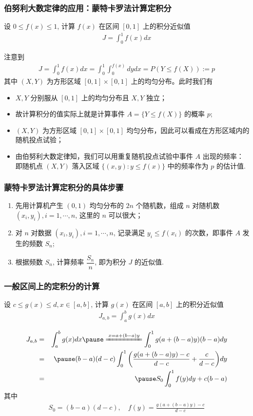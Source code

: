 \documentclass[Prob-All.tex]{subfiles}
\begin{document}
\begin{frame}
	\frametitle{伯努利大数定律的应用：蒙特卡罗法计算定积分}
	\begin{prob}
		设 $0\le f (x)\le 1$, 计算 $f (x)$ 在区间 $[0,1]$ 上的积分近似值
		\begin{eqnarray*}
			J=\int_0^1f(x)dx
		\end{eqnarray*}
	\end{prob}
	\pause \jieda 注意到
	\begin{eqnarray*}
		J=\int_0^1f(x)dx=\int_0^1\int_0^{f(x)}dydx=P(Y\le f(X)):=p
	\end{eqnarray*}
	其中 $(X,Y)$ 为方形区域 $[0,1]\times [0,1]$ 上的均匀分布。此时我们有 \pause
	\begin{itemize}[<+-|alert@+>]
		\item $X,Y$ 分别服从 $[0,1]$ 上的均匀分布且 $X,Y$ 独立；
		\item 故计算积分的值实际上就是计算事件 $A=\{Y\le f (X)\}$ 的概率 $p$;
		\item $(X,Y)$ 为方形区域 $[0,1]\times [0,1]$ 均匀分布，因此可以看成在方形区域内的随机投点试验；
		\item 由伯努利大数定律知，我们可以用重复随机投点试验中事件 $A$ 出现的频率：即随机点 $(X,Y)$ 落入区域 $\{(x,y):y\le f (x)\}$ 中的频率作为 $p$ 的估计值.

	\end{itemize}
\end{frame}
\begin{frame}
	\frametitle{蒙特卡罗法计算定积分的具体步骤}
	\begin{enumerate}[<+-|alert@+>]
		\item 先用计算机产生 $(0,1)$ 均匀分布的 $2n$ 个随机数，组成 $n$ 对随机数 $(x_i,y_i),i=1,\cdots,n$, 这里的 $n$ 可以很大；
		\item 对 $n$ 对数据 $(x_i,y_i), i=1,\cdots,n$, 记录满足 $y_i\le f (x_i)$ 的次数，即事件 $A$ 发生的频数 $S_n$;
		\item 根据频数 $S_n$, 计算频率 $\dfrac{S_n}{n}$, 即为积分 $J$ 的近似值.
	\end{enumerate}
\end{frame}
\begin{frame}
	\frametitle{一般区间上的定积分的计算}
	\begin{prob}
		设 $c\le g (x)\le d, x\in [a,b]$, 计算 $g (x)$ 在区间 $[a,b]$ 上的积分近似值
		\begin{eqnarray*}
			J_{a,b}=\int_a^bg(x)dx
		\end{eqnarray*}
	\end{prob}
	\pause \jieda
	\begin{eqnarray*}
		J_{a,b}&=&\int_a^bg(x)dx\pause \xlongequal{x=a+(b-a)y} \int_0^1g(a+(b-a)y)(b-a)dy\\
		&=&\pause (b-a)(d-c)\int_0^1\bigg(\frac{g(a+(b-a)y)-c}{d-c}+\frac{c}{d-c}\bigg)dy\\
		&=&\pause S_0\int_0^1f(y)dy+c(b-a)
	\end{eqnarray*}
	\pause 其中
	\begin{eqnarray*}
		S_0=(b-a)(d-c), \quad f(y)=\frac{g(a+(b-a)y)-c}{d-c}
	\end{eqnarray*}

\end{frame}
\end{document}
